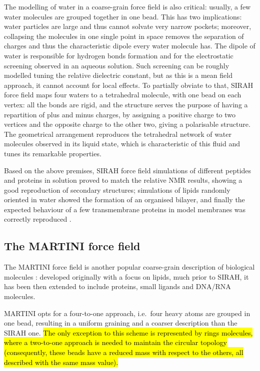 The modelling of water in a coarse-grain force field is also critical: usually, a few water molecules are grouped together in one bead. This has two implications: water particles are large and thus cannot solvate very narrow pockets; moreover, collapsing the molecules in one single point in space removes the separation of charges and thus the characteristic dipole every water molecule has. The dipole of water is responsible for hydrogen bonds formation and for the electrostatic screening observed in an aqueous solution. Such screening can be roughly modelled tuning the relative dielectric constant, but as this is a mean field approach, it cannot account for local effects.
%
To partially obviate to that, SIRAH force field maps four waters to a tetrahedral molecule, with one bead on each vertex: all the bonds are rigid, and the structure serves the purpose of having a repartition of plus and minus charges, by assigning a positive charge to two vertices and the opposite charge to the other two, giving a polarisable structure. The geometrical arrangement reproduces the tetrahedral network of water molecules observed in its liquid state, which is characteristic of this fluid and tunes its remarkable properties.

Based on the above premises, SIRAH force field simulations of different peptides and proteins in solution proved to match the relative NMR results, showing a good reproduction of secondary structures; simulations of lipids randomly oriented in water showed the formation of an organised bilayer, and finally the expected behaviour of a few transmembrane proteins in model membranes was correctly reproduced \cite{Machado2018,Barrera2019}.

 
\subsection{The MARTINI force field}
The MARTINI force field is another popular coarse-grain description of biological molecules \cite{Marrink2007,Monticelli2008,DeJong2013}: developed originally with a focus on lipids, much prior to SIRAH, it has been then extended to include proteins, small ligands and DNA/RNA molecules.

MARTINI opts for a four-to-one approach, i.e.\ four heavy atoms are grouped in one bead, resulting in a uniform graining and a coarser description than the SIRAH one. \hl{The only exception to this scheme is represented by rings molecules, where a two-to-one approach is needed to maintain the circular topology (consequently, these beads have a reduced mass with respect to the others, all described with the same mass value).}

